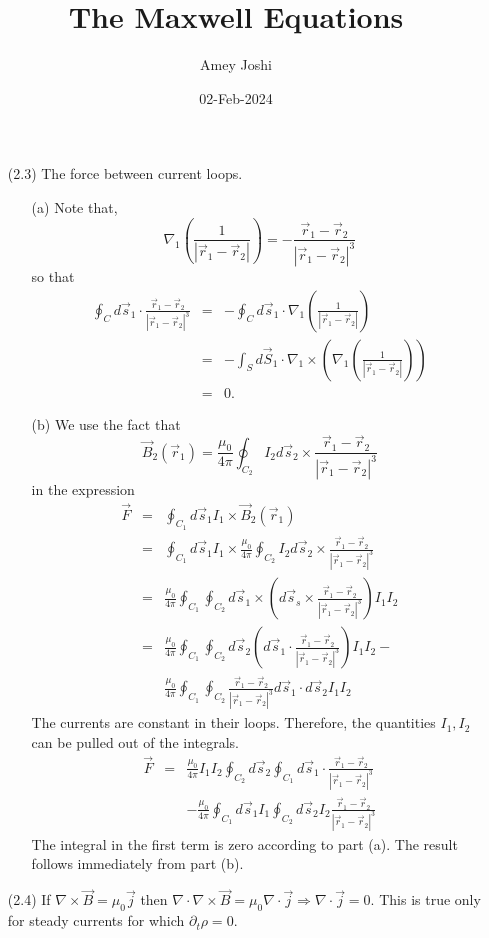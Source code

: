 \documentclass{article}
\title{The Maxwell Equations}\label{c2}
\author{Amey Joshi}
\date{02-Feb-2024}
\begin{document}
\maketitle
\begin{enumerate}
\item[(2.3)] The force between current loops.
\begin{enumerate}
\item[(a)] Note that,
\[
\nabla_1\left(\frac{1}{|\vec{r}_1 - \vec{r}_2|}\right) = -\frac{\vec{r}_1 - \vec{r}_2}{|\vec{r}_1 - \vec{r}_2|^3}
\]
so that
\begin{eqnarray*}
\oint_C d\vec{s}_1\cdot\frac{\vec{r}_1 - \vec{r}_2}{|\vec{r}_1 - \vec{r}_2|^3}
 &=& -\oint_C d\vec{s}_1\cdot\nabla_1\left(\frac{1}{|\vec{r}_1 - \vec{r}_2|}\right) \\
 &=& -\int_S d\vec{S}_1\cdot\nabla_1\times\left(\nabla_1\left(\frac{1}{|\vec{r}_1 - \vec{r}_2|}\right)\right)\\
 &=& 0.
\end{eqnarray*}

\item[(b)] We use the fact that
\[
\vec{B}_2(\vec{r}_1) = \frac{\mu_0}{4\pi}\oint_{C_2} I_2d\vec{s}_2 \times \frac{\vec{r}_1 - \vec{r}_2}{|\vec{r}_1 - \vec{r}_2|^3}
\]
in the expression
\begin{eqnarray*}
\vec{F} &=& \oint_{C_1}d\vec{s}_1 I_1 \times \vec{B}_2(\vec{r}_1) \\
 &=& \oint_{C_1}d\vec{s}_1I_1 \times \frac{\mu_0}{4\pi}\oint_{C_2} 
 	I_2d\vec{s}_2 \times \frac{\vec{r}_1 - \vec{r}_2}{|\vec{r}_1 - \vec{r}_2|^3} \\
 &=& \frac{\mu_0}{4\pi}\oint_{C_1}\oint_{C_2}d\vec{s}_1\times\left(d\vec{s}_s\times
        \frac{\vec{r}_1 - \vec{r}_2}{|\vec{r}_1 - \vec{r}_2|^3}\right)I_1I_2 \\
 &=& \frac{\mu_0}{4\pi}\oint_{C_1}\oint_{C_2}d\vec{s}_2\left(d\vec{s}_1\cdot
        \frac{\vec{r}_1 - \vec{r}_2}{|\vec{r}_1 - \vec{r}_2|^3}\right)I_1I_2  - \\
 & &  \frac{\mu_0}{4\pi}\oint_{C_1}\oint_{C_2}\frac{\vec{r}_1 - \vec{r}_2}{|\vec{r}_1 - \vec{r}_2|^3}
      d\vec{s}_1 \cdot d\vec{s}_2 I_1I_2
\end{eqnarray*}
The currents are constant in their loops. Therefore, the quantities $I_1, I_2$ 
can be pulled out of the integrals.
\begin{eqnarray*}
\vec{F} &=& \frac{\mu_0}{4\pi}I_1I_2\oint_{C_2}d\vec{s}_2\oint_{C_1}d\vec{s}_1\cdot
        \frac{\vec{r}_1 - \vec{r}_2}{|\vec{r}_1 - \vec{r}_2|^3} \\
 & & -\frac{\mu_0}{4\pi}\oint_{C_1}d\vec{s}_1I_1\oint_{C_2}d\vec{s}_2 I_2\frac{\vec{r}_1 - \vec{r}_2}{|\vec{r}_1 - \vec{r}_2|^3}
\end{eqnarray*}
The integral in the first term is zero according to part (a). The result
follows immediately from part (b).
\end{enumerate}

\item[(2.4)] If $\nabla\times\vec{B} = \mu_0\vec{j}$ then 
$\nabla\cdot\nabla\times\vec{B} = \mu_0\nabla\cdot\vec{j} \Rightarrow 
\nabla\cdot\vec{j} = 0$. This is true only for steady currents for which 
$\partial_t\rho = 0$.
\end{enumerate}
\end{document}
